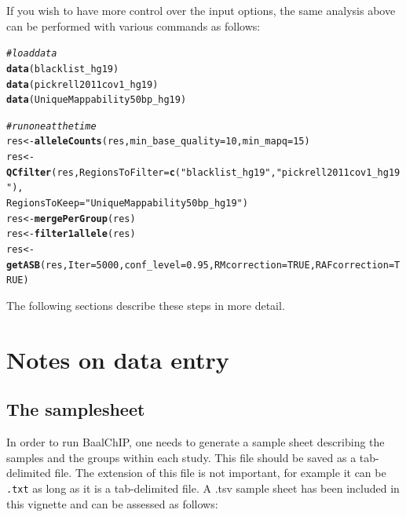 \documentclass{article}\usepackage[]{graphicx}\usepackage[usenames,dvipsnames]{color}
\makeatletter
\newcommand{\hlnum}[1]{\textcolor[rgb]{0.686,0.059,0.569}{#1}}%
\newcommand{\hlstr}[1]{\textcolor[rgb]{0.192,0.494,0.8}{#1}}%
\newcommand{\hlcom}[1]{\textcolor[rgb]{0.678,0.584,0.686}{\textit{#1}}}%
\newcommand{\hlstd}[1]{\textcolor[rgb]{0.345,0.345,0.345}{#1}}%
\newcommand{\hlkwb}[1]{\textcolor[rgb]{0.69,0.353,0.396}{#1}}%
\newcommand{\hlkwc}[1]{\textcolor[rgb]{0.333,0.667,0.333}{#1}}%
\newcommand{\hlkwd}[1]{\textcolor[rgb]{0.737,0.353,0.396}{\textbf{#1}}}%
\newenvironment{kframe}{%
 \def\at@end@of@kframe{}%
 \ifinner\ifhmode%
  \def\at@end@of@kframe{\end{minipage}}%
  \begin{minipage}{\columnwidth}%
 \fi\fi%
 \def\FrameCommand##1{\hskip\@totalleftmargin \hskip-\fboxsep
 \colorbox{shadecolor}{##1}\hskip-\fboxsep
     \hskip-\linewidth \hskip-\@totalleftmargin \hskip\columnwidth}%
 \MakeFramed {\advance\hsize-\width
   \@totalleftmargin\z@ \linewidth\hsize
   \@setminipage}}%
 {\par\unskip\endMakeFramed%
 \at@end@of@kframe}
\newenvironment{knitrout}{}{} %
\makeatother
\begin{document}
If you wish to have more control over the input options, the same analysis above can be performed with various commands as follows:

\begin{knitrout}
\color{fgcolor}\begin{kframe}
\begin{alltt}
\hlcom{#load data}
\hlkwd{data}\hlstd{(blacklist_hg19)}
\hlkwd{data}\hlstd{(pickrell2011cov1_hg19)}
\hlkwd{data}\hlstd{(UniqueMappability50bp_hg19)}

\hlcom{#run one at the time}
\hlstd{res} \hlkwb{<-} \hlkwd{alleleCounts}\hlstd{(res,} \hlkwc{min_base_quality}\hlstd{=}\hlnum{10}\hlstd{,} \hlkwc{min_mapq}\hlstd{=}\hlnum{15}\hlstd{)}
\hlstd{res} \hlkwb{<-} \hlkwd{QCfilter}\hlstd{(res,} \hlkwc{RegionsToFilter}\hlstd{=}\hlkwd{c}\hlstd{(}\hlstr{"blacklist_hg19"}\hlstd{,} \hlstr{"pickrell2011cov1_hg19"}\hlstd{),}
                \hlkwc{RegionsToKeep}\hlstd{=}\hlstr{"UniqueMappability50bp_hg19"}\hlstd{)}
\hlstd{res} \hlkwb{<-} \hlkwd{mergePerGroup}\hlstd{(res)}
\hlstd{res} \hlkwb{<-} \hlkwd{filter1allele}\hlstd{(res)}
\hlstd{res} \hlkwb{<-} \hlkwd{getASB}\hlstd{(res,} \hlkwc{Iter}\hlstd{=}\hlnum{5000}\hlstd{,} \hlkwc{conf_level}\hlstd{=}\hlnum{0.95}\hlstd{,} \hlkwc{RMcorrection} \hlstd{=} \hlnum{TRUE}\hlstd{,} \hlkwc{RAFcorrection}\hlstd{=}\hlnum{TRUE}\hlstd{)}
\end{alltt}
\end{kframe}
\end{knitrout}

The following sections describe these steps in more detail.

\section{Notes on data entry}

\subsection{The samplesheet}

In order to run BaalChIP, one needs to generate a sample sheet describing the samples and the groups within each study. This file should be saved as a tab-delimited file. The extension of this file is not important, for example it can be \texttt{.txt} as long as it is a tab-delimited file.
A .tsv sample sheet has been included in this vignette and can be assessed as follows:
\end{document}
